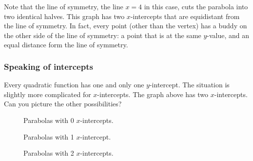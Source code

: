Note that the line of symmetry, the line $x=4$ in this case, cuts the parabola into two identical halves. This graph has two $x$-intercepts that are equidistant from
the line of symmetry. In fact, every point (other than the vertex) has a buddy on the other side of the line of symmetry: a point that is at the same $y$-value, and an equal distance form the line of symmetry.

\subsubsection{Speaking of intercepts}

Every quadratic function has one and only one $y$-intercept. The situation is slightly more complicated for $x$-intercepts. The graph above has two $x$-intercepts. Can you picture the other possibilities?

\begin{figure}
\begin{minipage}{0.32\textwidth}
	\centering
	Parabolas with 0 $x$-intercepts.
\end{minipage}
%
\begin{minipage}{0.32\textwidth}
	\centering
	Parabolas with 1 $x$-intercept.
\end{minipage}
%
\begin{minipage}{0.32\textwidth}
	\centering
	Parabolas with 2 $x$-intercepts.
\end{minipage}
\end{figure}

